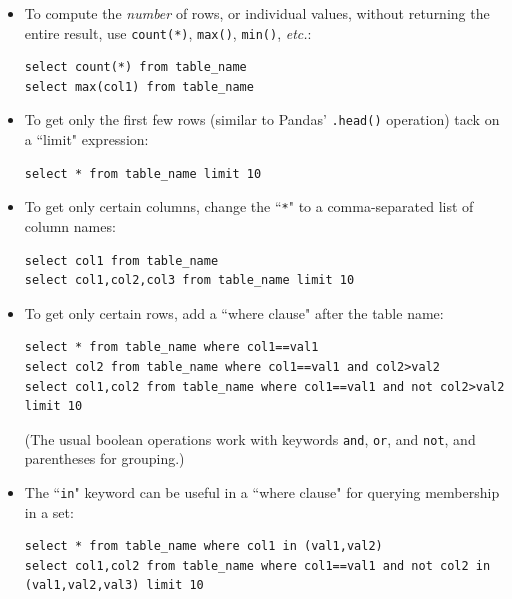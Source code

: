\documentclass[12pt]{article}
\begin{document}
\begin{itemize}
\itemsep.1em
\item To compute the \textit{number} of rows, or individual values, without
returning the entire result, use \texttt{count(*)}, \texttt{max()},
\texttt{min()}, \textit{etc.}:

\footnotesize
\begin{Verbatim}[fontsize=small,samepage=true,frame=none]
select count(*) from table_name
select max(col1) from table_name
\end{Verbatim}
\normalsize

\item To get only the first few rows (similar to Pandas' \texttt{.head()}
operation) tack on a ``limit" expression:

\footnotesize
\begin{Verbatim}[fontsize=small,samepage=true,frame=none]
select * from table_name limit 10
\end{Verbatim}
\normalsize

\item To get only certain columns, change the ``\texttt{*}" to a
comma-separated list of column names:

\footnotesize
\begin{Verbatim}[fontsize=small,samepage=true,frame=none]
select col1 from table_name
select col1,col2,col3 from table_name limit 10
\end{Verbatim}
\normalsize

\item To get only certain rows, add a ``where clause" after the table name:

\footnotesize
\begin{Verbatim}[fontsize=small,samepage=true,frame=none]
select * from table_name where col1==val1
select col2 from table_name where col1==val1 and col2>val2
select col1,col2 from table_name where col1==val1 and not col2>val2 limit 10
\end{Verbatim}
\normalsize

(The usual boolean operations work with keywords \texttt{and}, \texttt{or},
and \texttt{not}, and parentheses for grouping.)

\item The ``\texttt{in}" keyword can be useful in a ``where clause" for
querying membership in a set:

\scriptsize
\begin{Verbatim}[fontsize=small,samepage=true,frame=none]
select * from table_name where col1 in (val1,val2)
select col1,col2 from table_name where col1==val1 and not col2 in (val1,val2,val3) limit 10
\end{Verbatim}
\normalsize


\end{itemize}
\end{document}
